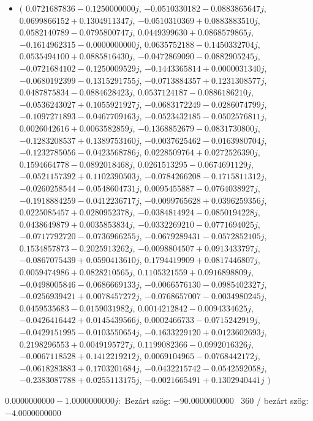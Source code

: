 \documentclass[14pt,a4paper]{article}
\begin{document}
\begin{itemize}
\item
$\big($
$0.0721687836-0.1250000000j$, $-0.0510330182-0.0883865647j$, $0.0699866152+0.1304911347j$, $-0.0510310369+0.0883883510j$, $0.0582140789-0.0795800747j$, $0.0449399630+0.0868579865j$, $-0.1614962315-0.0000000000j$, $0.0635752188-0.1450332704j$, $0.0535494100+0.0885816430j$, $-0.0472869090-0.0882905245j$, $-0.0721684102-0.1250009529j$, $-0.1443365814+0.0000031340j$, $-0.0680192399-0.1315291755j$, $-0.0713884357+0.1231308577j$, $0.0487875834-0.0884628423j$, $0.0537124187-0.0886186210j$, $-0.0536243027+0.1055921927j$, $-0.0683172249-0.0286074799j$, $-0.1097271893-0.0467709163j$, $-0.0523432185-0.0502576811j$, $0.0026042616+0.0063582859j$, $-0.1368852679-0.0831730800j$, $-0.1283208537+0.1389753160j$, $-0.0037625462-0.0163980704j$, $-0.1232785056-0.0423568786j$, $0.0228509764+0.0272526390j$, $0.1594664778-0.0892018468j$, $0.0261513295-0.0674691129j$, $-0.0521157392+0.1102390503j$, $-0.0784266208-0.1715811312j$, $-0.0260258544-0.0548604731j$, $0.0095455887-0.0764038927j$, $-0.1918884259-0.0412236717j$, $-0.0099765628+0.0396259356j$, $0.0225085457+0.0280952378j$, $-0.0384814924-0.0850194228j$, $0.0438649879+0.0035853834j$, $-0.0332269210-0.0771694025j$, $-0.0717792720-0.0736966255j$, $-0.0679289431-0.0572852105j$, $0.1534857873-0.2025913262j$, $-0.0098804507+0.0913433797j$, $-0.0867075439+0.0590413610j$, $0.1794419909+0.0817446807j$, $0.0059474986+0.0828210565j$, $0.1105321559+0.0916898809j$, $-0.0498005846-0.0686669133j$, $-0.0066576130-0.0985402327j$, $-0.0256939421+0.0078457272j$, $-0.0768657007-0.0034980245j$, $0.0459535683-0.0159031982j$, $0.0014212842-0.0094334625j$, $-0.0426416442+0.0145439566j$, $0.0002466733-0.0715242919j$, $-0.0429151995-0.0103550654j$, $-0.1633229120+0.0123602693j$, $0.2198296553+0.0049195727j$, $0.1199082366-0.0992016326j$, $-0.0067118528+0.1412219212j$, $0.0069104965-0.0768442172j$, $-0.0618283883+0.1703201684j$, $-0.0432215742-0.0542592058j$, $-0.2383087788+0.0255113175j$, $-0.0021665491+0.1302940441j$
$\big)$
\end{itemize}
$0.0000000000-1.0000000000j$:\
Bezárt szög: $-90.0000000000$ \
360 / bezárt szög: $-4.0000000000$\
\end{document}
